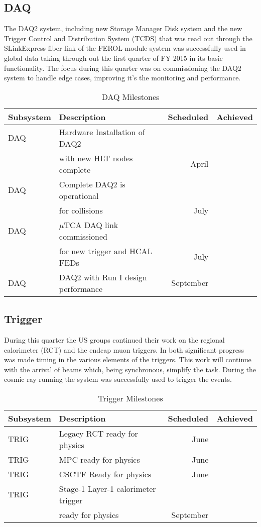 \documentclass[12pt]{article}
\begin{document}
\subsection{DAQ}
The DAQ2 system, including new Storage Manager Disk system and the new Trigger Control and Distribution System (TCDS) that was read out through the SLinkExpress fiber link of the FEROL module system was successfully used in global data taking through out the first quarter of FY 2015 in its basic functionality. The focus during this quarter was on commissioning the DAQ2 system to handle edge cases, improving it's the monitoring and performance.
\begin{table}[h]
\caption{DAQ Milestones}
\begin{center}
\begin{tabular}{|l|l|r|r|}
\hline
Subsystem&Description&Scheduled&Achieved\\
\hline
DAQ& Hardware Installation of DAQ2& & \\
& with new HLT nodes complete& April & \\
\hline
DAQ& Complete DAQ2 is operational & & \\
&for collisions& July & \\
\hline
DAQ&$\mu$TCA DAQ link commissioned & & \\
&for new trigger and HCAL FEDs& July & \\
\hline
DAQ&DAQ2 with Run I design performance & September & \\
\hline
\end{tabular}
\end{center}
\label{DAQMilestones}
\end{table}%


\subsection{Trigger}
During this quarter the US groups continued their work on the regional calorimeter (RCT) and the endcap muon triggers.  In both significant progress was made timing in the various elements of the triggers.   
This work will continue with the arrival of beams which, being synchronous, simplify the task.  During the cosmic ray running the system was successfully used to trigger the events.
\begin{table}[h]
\caption{Trigger Milestones}
\begin{center}
\begin{tabular}{|l|l|r|r|}
\hline
Subsystem&Description&Scheduled&Achieved\\
\hline
TRIG&Legacy RCT ready for physics&June &\\
\hline
TRIG&MPC ready for physics&June &\\
\hline
TRIG&CSCTF Ready for physics&June & \\
\hline
TRIG& Stage-1 Layer-1 calorimeter trigger&&\\
& ready for physics &September&\\
\hline
\end{tabular}
\end{center}
\label{TriggerMilestones}
\end{table}%
\end{document}

